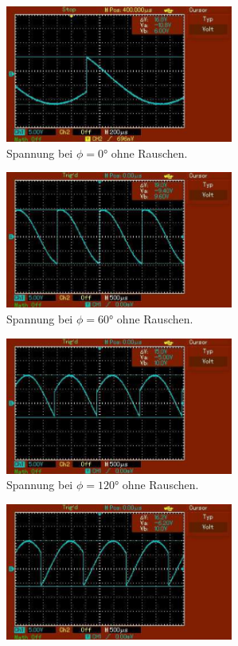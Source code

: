 \begin{figure}[H]
  \begin{subfigure}{0.42\textwidth}
      \centering
      \includegraphics[height=4.5cm]{content/abbildungen/ohne/0.pdf}
      \caption{Spannung bei $\phi = 0°$ ohne Rauschen.}
  \end{subfigure}
\hfill 
  \begin{subfigure}{0.42\textwidth}
      \centering
      \includegraphics[height=4.5cm]{content/abbildungen/ohne/60.pdf}
      \caption{Spannung bei $\phi = 60°$ ohne Rauschen.}
  \end{subfigure}
\hfill 
  \begin{subfigure}{0.42\textwidth}
      \centering
      \includegraphics[height=4.5cm]{content/abbildungen/ohne/120.pdf}
      \caption{Spannung bei $\phi = 120°$ ohne Rauschen.}
  \end{subfigure}
\hfill 
  \begin{subfigure}{0.42\textwidth}
      \centering
      \includegraphics[height=4.5cm]{content/abbildungen/ohne/180.pdf}

\end{subfigure}
\end{figure}
